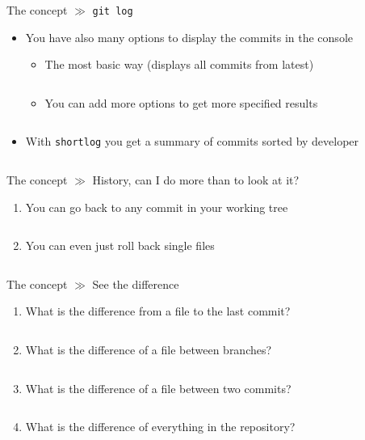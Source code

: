 \documentclass[10pt]{beamer}
\begin{document}
\begin{frame}{The concept $\gg$ \texttt{git log}}
	\begin{itemize}
		\item You have also many options to display the commits in the console
		\begin{itemize}
			\item The most basic way (displays all commits from latest)
			\inputminted[bgcolor=lightGreyCustom,fontsize=\scriptsize]{sh}{./resources/git_log_01_normal.sh}
			\item You can add more options to get more specified results
			\inputminted[bgcolor=lightGreyCustom,fontsize=\scriptsize]{sh}{./resources/git_log_02_options.sh}
		\end{itemize}
		\item With \texttt{shortlog} you get a summary of commits sorted by developer
		\inputminted[bgcolor=lightGreyCustom,fontsize=\scriptsize]{sh}{./resources/git_log_03_shortlog.sh}
	\end{itemize}
\end{frame}

\begin{frame}{The concept $\gg$ History, can I do more than to look at it?}
	\begin{enumerate}
		\item You can go back to any commit in your working tree
		\inputminted[bgcolor=lightGreyCustom,fontsize=\scriptsize]{sh}{./resources/git_checkout_01_repo.sh}
		\item You can even just roll back single files
		\inputminted[bgcolor=lightGreyCustom,fontsize=\scriptsize]{sh}{./resources/git_checkout_02_single_file.sh}
	\end{enumerate}
\end{frame}

\begin{frame}{The concept $\gg$ See the difference}
\begin{enumerate}
	\item What is the difference from a file to the last commit?
	\inputminted[bgcolor=lightGreyCustom,fontsize=\scriptsize]{sh}{./resources/git_diff_01_file.sh}
	\item What is the difference of a file between branches?
	\inputminted[bgcolor=lightGreyCustom,fontsize=\scriptsize]{sh}{./resources/git_diff_02_file_branches.sh}
	\item What is the difference of a file between two commits?
	\inputminted[bgcolor=lightGreyCustom,fontsize=\scriptsize]{sh}{./resources/git_diff_03_file_commits.sh}
	\item What is the difference of everything in the repository?
	\inputminted[bgcolor=lightGreyCustom,fontsize=\scriptsize]{sh}{./resources/git_diff_04_everything.sh}
\end{enumerate}
\end{frame}
\end{document}
